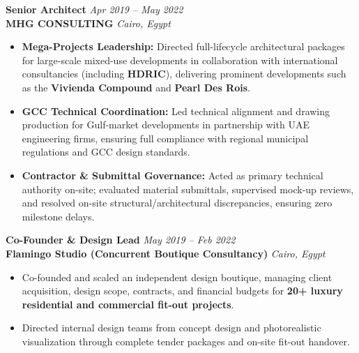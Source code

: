 \documentclass[a4paper,10pt]{article}
\begin{document}
\vspace{4pt}
\textbf{Senior Architect} \hfill \textit{Apr 2019 -- May 2022} \\
\textbf{\color{secondary}MHG CONSULTING} \hfill \textit{Cairo, Egypt}
\begin{itemize}
    \item \textbf{Mega-Projects Leadership:} Directed full-lifecycle architectural packages for large-scale mixed-use developments in collaboration with international consultancies (including \textbf{HDRIC}), delivering prominent developments such as the \textbf{Vivienda Compound} and \textbf{Pearl Des Rois}.
    \item \textbf{GCC Technical Coordination:} Led technical alignment and drawing production for Gulf-market developments in partnership with UAE engineering firms, ensuring full compliance with regional municipal regulations and GCC design standards.
    \item \textbf{Contractor \& Submittal Governance:} Acted as primary technical authority on-site; evaluated material submittals, supervised mock-up reviews, and resolved on-site structural/architectural discrepancies, ensuring zero milestone delays.
\end{itemize}

\vspace{4pt}
\textbf{Co-Founder \& Design Lead} \hfill \textit{May 2019 -- Feb 2022} \\
\textbf{\color{secondary}Flamingo Studio (Concurrent Boutique Consultancy)} \hfill \textit{Cairo, Egypt}
\begin{itemize}
    \item Co-founded and scaled an independent design boutique, managing client acquisition, design scope, contracts, and financial budgets for \textbf{20+ luxury residential and commercial fit-out projects}.
    \item Directed internal design teams from concept design and photorealistic visualization through complete tender packages and on-site fit-out handover.
\end{itemize}

\end{document}
